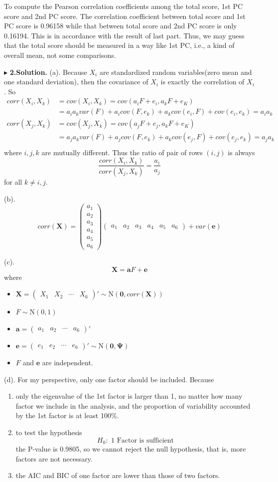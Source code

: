 \documentclass[letterpaper, 12pt]{article}
\newcommand{\ba}{$$\begin{aligned}}
\newcommand{\ea}{\end{aligned}$$}
\newcommand{\lma}{\left(\begin{matrix}}
\newcommand{\rma}{\end{matrix}\right)}
\begin{document}
To compute the Pearson correlation coefficients among the total score, 1st PC score and 2nd PC score. The correlation coefficient between total score and 1st PC score is 0.96158 while that between total score and 2nd PC score is only 0.16194. This is in accordance with the result of last part. Thus, we may guess that the total score should be measured in a way like 1st PC, i.e., a kind of overall mean, not some comparisons.




$\blacktriangleright$ \textbf{2.\quad Solution.} 
(a). Because $X_i$ are standardized random variables(zero mean and one standard deviation), then the covariance of $X_i$ is exactly the correlation of $X_i$. So
\ba
corr(X_i,X_k)&=cov(X_i,X_k)=cov(a_iF+e_i,a_kF+e_K)\\
&=a_ia_kvar(F)+a_icov(F,e_k)+a_kcov(e_i,F)+cov(e_i,e_k)=a_ia_k\\
corr(X_j,X_k)&=cov(X_j,X_k)=cov(a_jF+e_j,a_kF+e_K)\\
&=a_ja_kvar(F)+a_jcov(F,e_k)+a_kcov(e_j,F)+cov(e_j,e_k)=a_ja_k\\
\ea
where $i,j,k$ are mutually different. Thus the ratio of pair of rows $(i,j)$ is always
$$
\frac{corr(X_i,X_k)}{corr(X_j,X_k)}=\frac{a_i}{a_j}
$$
for all $k\not=i,j$.


(b). 
$$
corr(\bm{X})=\lma a_1\\a_2\\a_3\\a_4\\a_5\\a_6\rma\lma a_1&a_2&a_3&a_4&a_5&a_6\rma+var(\bm{e})
$$

(c). 
$$
\bm{X}=\bm{a}F+\bm{e}
$$
where 
\begin{itemize}
\item $\bm{X}=\lma X_1&X_2&\cdots&X_6\rma'\sim \text{N}(\bm{0},corr(\bm{X}))$
\item $F\sim\text{N}(0,1)$
\item $\bm{a}=\lma a_1&a_2&\cdots&a_6\rma'$
\item $\bm{e}=\lma e_1&e_2&\cdots&e_6\rma'\sim \text{N}(\bm{0},\bm{\Psi})$
\item $F$ and $\bm{e}$ are independent.
\end{itemize}


(d). For my perspective, only one factor should be included. Because
\begin{enumerate}
\item only the eigenvalue of the 1st factor is larger than 1, no matter how many factor we include in the analysis, and the proportion of variability accounted by the 1st factor is at least 100\%.
\item to test the hypothesis
$$
H_0:\text{ 1 Factor is sufficient}
$$
the P-value is 0.9805, so we cannot reject the null hypothesis, that is, more factors are not necessary.
\item the AIC and BIC of one factor are lower than those of two factors.
\end{enumerate}
\end{document}
